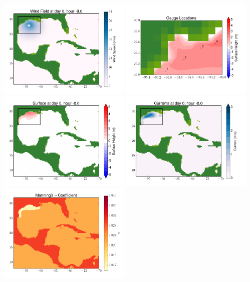 \documentclass[11pt]{article}
\begin{document}
\vskip 10pt 
\includegraphics[width=0.475\textwidth]{frame0063fig9.png}
\includegraphics[width=0.475\textwidth]{frame0063fig10.png}
\vskip 10pt 
\includegraphics[width=0.475\textwidth]{frame0064fig1.png}
\includegraphics[width=0.475\textwidth]{frame0064fig2.png}
\vskip 10pt 
\includegraphics[width=0.475\textwidth]{frame0064fig3.png}
\end{document}
